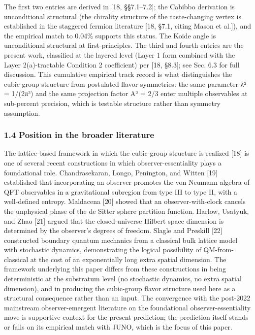 \documentclass[
  11pt,
  letterpaper,
]{article}
\begin{document}
The first two entries are derived in {[}18, §§7.1--7.2{]}; the Cabibbo
derivation is unconditional structural (the chirality structure of the
taste-changing vertex is established in the staggered fermion literature
{[}18, §7.1, citing Mason et al.{]}), and the empirical match to 0.04\%
supports this status. The Koide angle is unconditional structural at
first-principles. The third and fourth entries are the present work,
classified at the layered level (Layer 1 form combined with the Layer
2(a)-tractable Condition 2 coefficient) per {[}18, §8.3{]}; see Sec. 6.3
for full discussion. This cumulative empirical track record is what
distinguishes the cubic-group structure from postulated flavor
symmetries: the same parameter λ² = 1/(2π²) and the same projection
factor A² = 2/3 enter multiple observables at sub-percent precision,
which is testable structure rather than symmetry assumption.

\hypertarget{position-in-the-broader-literature}{%
\subsubsection{1.4 Position in the broader
literature}\label{position-in-the-broader-literature}}

The lattice-based framework in which the cubic-group structure is
realized {[}18{]} is one of several recent constructions in which
observer-essentiality plays a foundational role. Chandrasekaran, Longo,
Penington, and Witten {[}19{]} established that incorporating an
observer promotes the von Neumann algebra of QFT observables in a
gravitational subregion from type III to type II, with a well-defined
entropy. Maldacena {[}20{]} showed that an observer-with-clock cancels
the unphysical phase of the de Sitter sphere partition function. Harlow,
Usatyuk, and Zhao {[}21{]} argued that the closed-universe Hilbert space
dimension is determined by the observer's degrees of freedom. Slagle and
Preskill {[}22{]} constructed boundary quantum mechanics from a
classical bulk lattice model with stochastic dynamics, demonstrating the
logical possibility of QM-from-classical at the cost of an exponentially
long extra spatial dimension. The framework underlying this paper
differs from these constructions in being deterministic at the
substratum level (no stochastic dynamics, no extra spatial dimension),
and in producing the cubic-group flavor structure used here as a
structural consequence rather than an input. The convergence with the
post-2022 mainstream observer-emergent literature on the foundational
observer-essentiality move is supportive context for the present
prediction; the prediction itself stands or falls on its empirical match
with JUNO, which is the focus of this paper.
\end{document}
